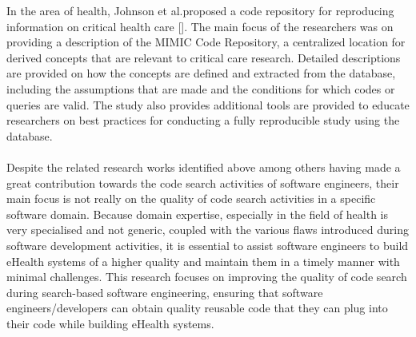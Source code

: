 \documentclass[a4paper]{article}
\begin{document}
In the area of health, Johnson et al.proposed a code repository for reproducing information on critical health care []. The main focus of the researchers was on providing a description of the MIMIC Code Repository, a centralized location for derived concepts that are relevant to critical care research. Detailed descriptions are provided on how the concepts are defined and extracted from the database, including the assumptions that are made and the conditions for which codes or queries are valid. The study also provides additional tools are provided to educate researchers on best practices for conducting a fully reproducible study using the database.\\\\
Despite the related research works identified above among others having made a great contribution towards the code search activities of software engineers, their main focus is not really on the quality of code search activities in a specific software domain. Because domain expertise, especially in the field of health is very specialised and not generic, coupled with the various flaws introduced during software development activities, it is essential to assist software engineers to build eHealth systems of a higher quality and maintain them in a timely manner with minimal challenges. This research focuses on improving the quality of code search during search-based software engineering, ensuring that software engineers/developers can obtain quality reusable code that they can plug into their code while building eHealth systems.
\end{document}
